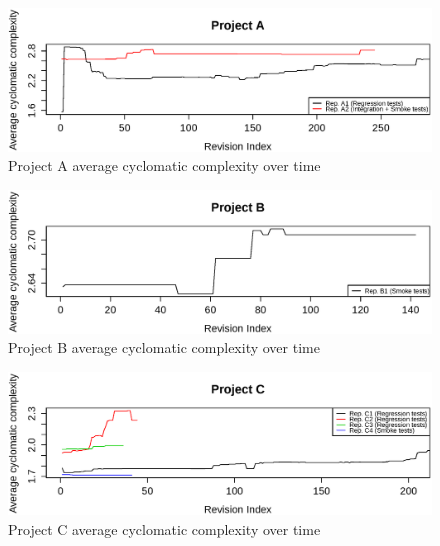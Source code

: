     
\begin{figure}[!htbp]
    \centering
    \includegraphics[width=\textwidth,keepaspectratio]{figure/results/rq1/project_a_avg_complexity.eps}
    \caption{Project A average cyclomatic complexity over time}
    \label{fig:project_a_avg_complexity}
\end{figure}

\begin{figure}[!htbp]
    \centering
    \includegraphics[width=\textwidth,keepaspectratio]{figure/results/rq1/project_b_avg_complexity.eps}
    \caption{Project B average cyclomatic complexity over time}
    \label{fig:project_b_avg_complexity}
\end{figure}

\begin{figure}[!htbp]
    \centering
    \includegraphics[width=\textwidth,keepaspectratio]{figure/results/rq1/project_c_avg_complexity.eps}
    \caption{Project C average cyclomatic complexity over time}
    \label{fig:project_c_avg_complexity}
\end{figure}

